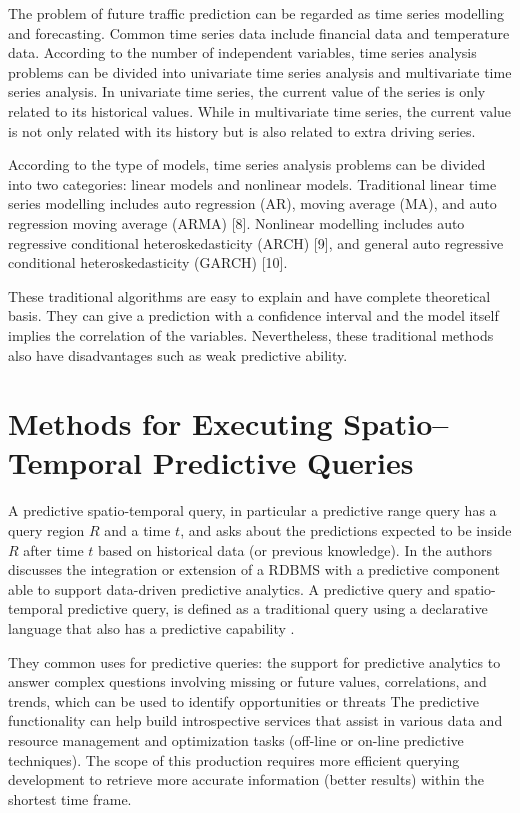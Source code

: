 The problem of future traffic prediction can be regarded as time series modelling and forecasting. Common time series data include financial data and temperature data. According to the number of independent variables, time series analysis problems can be divided into univariate time series analysis and multivariate time series analysis. In univariate time series, the current value of the series is only related to its historical values. While in multivariate time series, the current value is not only related with its history but is also related to extra driving series. 

According to the type of models, time series analysis problems can be divided into two categories: linear models and nonlinear models. Traditional linear time series modelling includes auto regression (AR), moving average (MA), and auto regression moving average (ARMA) [8]. Nonlinear modelling includes auto regressive conditional heteroskedasticity (ARCH) [9], and general auto regressive conditional heteroskedasticity (GARCH) [10].

These traditional algorithms are easy to explain and have complete theoretical basis. They can give a prediction with a confidence interval and the model itself implies the correlation of the variables. Nevertheless, these traditional methods also have disadvantages such as weak predictive ability.

\section{Methods for Executing Spatio--Temporal Predictive Queries}
\label{Sec:RelatedWorksQueries}

A predictive spatio-temporal query, in particular a predictive range query has a query region $R$ and a time $t$, and asks about the predictions expected to be inside $R$ after time $t$ based on historical data (or previous knowledge).  In \cite{Akdere2011} the authors discusses the integration or extension of a RDBMS with a predictive component able to support data-driven predictive analytics. A predictive query and spatio-temporal predictive query, is defined as a traditional query using a declarative language that also has a predictive capability \cite{Hendawi2012}. 

They common uses for predictive queries: the support for predictive analytics to answer complex questions involving missing or future values, correlations, and trends, which  can be used to identify opportunities or threats
The predictive functionality can help build introspective services that assist in various data and resource management and optimization tasks (off-line or on-line predictive techniques). 
The  scope  of  this  production requires  more  efficient  querying development to  retrieve more accurate  information (better results)  within  the  shortest time  frame.

